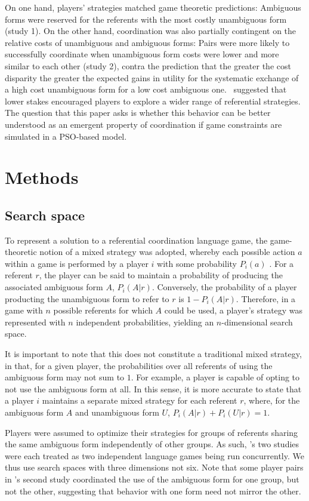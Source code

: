 \documentclass[a4paper,11pt]{article}
\begin{document}
On one hand, players' strategies matched game theoretic predictions: Ambiguous forms were reserved for the referents with the most costly unambiguous form (study 1).  On the other hand, coordination was also partially contingent on the relative costs of unambiguous and ambiguous forms: Pairs were more likely to successfully coordinate when unambiguous form costs were lower and more similar to each other (study 2), contra the prediction that the greater the cost disparity the greater the expected gains in utility for the systematic exchange of a high cost unambiguous form for a low cost ambiguous one. \citeauthor{rohde2012}\ suggested that lower stakes encouraged players to explore a wider range of referential strategies. The question that this paper asks is whether this behavior can be better understood as an emergent property of coordination if game constraints are simulated in a PSO-based model.


\section{Methods}
\subsection{Search space}
\label{sec:search_space}
To represent a solution to a referential coordination language game, the game-theoretic notion of a mixed strategy was adopted, whereby each possible action $a$ within a game is performed by a player $i$ with some probability $P_i(a)$ \cite{benz2005}. For a referent $r$, the player can be said to maintain a probability of producing the associated ambiguous form $A$, $P_i(A|r)$. Conversely, the probability of a player producting the unambiguous form to refer to $r$ is $1 - P_i(A|r)$. Therefore, in a game with $n$ possible referents for which $A$ could be used, a player's strategy was represented with $n$ independent probabilities, yielding an $n$-dimensional search space. 

It is important to note that this does not constitute a traditional mixed strategy, in that, for a given player, the probabilities over all referents of using the ambiguous form may not sum to $1$.  For example, a player is capable of opting to not use the ambiguous form at all. In this sense, it is more accurate to state that a player $i$ maintains a separate mixed strategy for each referent $r$, where, for the ambiguous form $A$ and unambiguous form $U$, $P_i(A|r) + P_i(U|r) = 1$.

Players were assumed to optimize their strategies for groups of referents sharing the same ambiguous form independently of other groups. As such, \citeauthor{rohde2012}'s two studies were each treated as two independent language games being run concurrently. We thus use search spaces with three dimensions not six. Note that some player pairs in \citeauthor{rohde2012}'s second study coordinated the use of the ambiguous form for one group, but not the other, suggesting that behavior with one form need not mirror the other.
\end{document}
